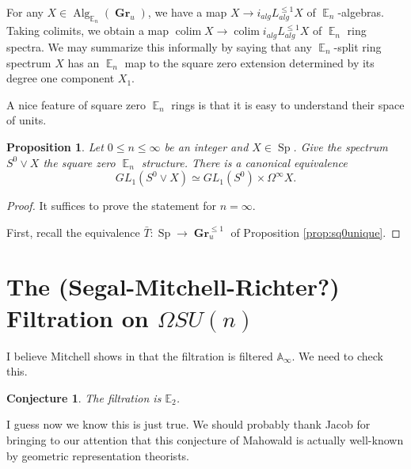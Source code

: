 \documentclass[reqno, oneside]{amsart}
\theoremstyle{definition}
\theoremstyle{plain}
\newtheorem{prop}[nul]{Proposition}
\newtheorem{cnj}[nul]{Conjecture}
\DeclareMathOperator*{\colim}{\text{colim}}
\DeclareMathOperator{\E}{\mathbb{E}}
\DeclareMathOperator{\Gr}{\textbf{Gr}}
\DeclareMathOperator{\Alg}{\text{Alg}}
\DeclareMathOperator{\Sp}{\text{Sp}}
\begin{document}
For any $X\in \Alg_{\E_n}(\Gr_u)$, we have a map $X\to i_{alg}L^{\leq 1}_{alg}X$ of $\E_n$-algebras.  Taking colimits, we obtain a map $\colim X \to \colim i_{alg}L^{\leq 1}_{alg}X$ of $\E_n$ ring spectra.
 We may summarize this informally by saying that any $\E_n$-split ring spectrum $X$ has an $\E_n$ map to the square zero extension determined by its degree one component $X_1$.  

A nice feature of square zero $\E_n$ rings is that it is easy to understand their space of units.  

\begin{prop}
Let $0\leq n\leq \infty$ be an integer and $X\in \Sp$.  Give the spectrum $S^0\vee X$ the square zero $\E_n$ structure.  There is a canonical equivalence $$GL_1(S^0\vee X) \simeq GL_1(S^0) \times \Omega^{\infty} X.$$
\end{prop}
\begin{proof}
It suffices to prove the statement for $n=\infty.$  

First, recall the equivalence $\bar{T}:\Sp \to \Gr^{\leq 1}_u$ of Proposition \ref{prop:sq0unique}.  



\end{proof}


\section{The (Segal-Mitchell-Richter?) Filtration on \texorpdfstring{$\Omega SU(n)$}{Loops SU(n)}}

I believe Mitchell shows in \cite{MitchellSU(n)} that the filtration is filtered $\mathbb{A}_\infty$.  We need to check this.

\begin{cnj} The filtration is $\mathbb{E}_2$.
\end{cnj}
I guess now we know this is just true.  We should probably thank Jacob for bringing to our attention that this conjecture of Mahowald is actually well-known by geometric representation theorists.  
\end{document}
